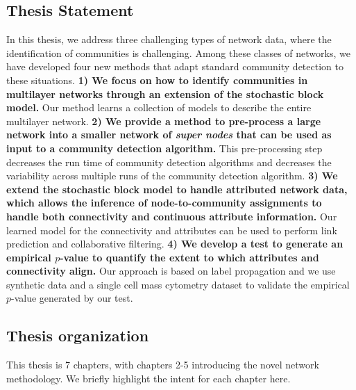 \subsection{Thesis Statement}
In this thesis, we address three challenging types of network data,  where the identification of communities is challenging. Among these classes of networks, we have developed four new methods that adapt standard community detection to these situations. {\bf 1) We focus on how to identify communities in multilayer networks through an extension of the stochastic block model.} Our method learns a collection of models to describe the entire multilayer network. {\bf 2) We provide a method to pre-process a large network into a smaller network of \emph{super nodes} that can be used as input to a community detection algorithm.} This pre-processing step decreases the run time of community detection algorithms and decreases the variability across multiple runs of the community detection algorithm. {\bf 3) We extend the stochastic block model to handle attributed network data, which allows the inference of node-to-community assignments to handle both connectivity and continuous attribute information.} Our learned model for the connectivity and attributes can be used to perform link prediction and collaborative filtering.  {\bf 4) We develop a test to generate an empirical $p$-value to quantify the extent to which attributes and connectivity align.} Our approach is based on label propagation and we use synthetic data and a single cell mass cytometry dataset to validate the empirical $p$-value generated by our test.

\subsection{Thesis organization}
This thesis is 7 chapters, with chapters 2-5 introducing the novel network methodology. We briefly highlight the intent for each chapter here.

